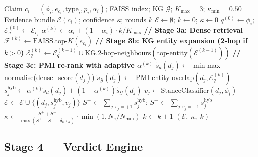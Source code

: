 \documentclass[12pt,a4paper]{article}
\theoremstyle{definition}
\theoremstyle{plain}
\theoremstyle{remark}
\newcommand{\KG}{\mathcal{G}}
\begin{document}
\begin{algorithm}[H]
\caption{ARRS Stage 3 --- Agentic Hybrid Retrieval Loop (Per-Claim)}
\label{alg:arrs_retrieval_loop}
\begin{algorithmic}[1]
\Require Claim $c_i = (\phi_i, e_{c_i}, \text{type}_i, p_i, \alpha_i)$;
         FAISS index; KG $\mathcal{G}$; $K_{\max} = 3$; $\kappa_{\min} = 0.50$
\Ensure Evidence bundle $\mathcal{E}(c_i)$; confidence $\kappa$; rounds $k$
\State $\mathcal{E} \gets \emptyset$; $k \gets 0$; $\kappa \gets 0$
\State $q^{(0)} \gets \phi_i$; 
       $\mathcal{E}_q^{(0)} \gets \mathcal{E}_{c_i}$ 
  \State $\alpha^{(k)} \gets \alpha_i + (1-\alpha_i) \cdot k / K_{\max}$
  \State \textbf{// Stage 3a: Dense retrieval}
  \State $\mathcal{F}^{(k)} \gets \text{FAISS.top-}K(e_{c_i})$ 
  \State \textbf{// Stage 3b: KG entity expansion (2-hop if $k > 0$)}
    \State $\mathcal{E}_q^{(k)} \gets \mathcal{E}_q^{(k-1)} \cup 
           \text{KG.2-hop-neighbours}(\text{top-entity}(\mathcal{E}^{(k-1)}))$
  \EndIf
  \State \textbf{// Stage 3c: PMI re-rank with adaptive $\alpha^{(k)}$}
    \State $\tilde{s}_d(d_j) \gets $ min-max-normalise(dense\_score$(d_j)$)
    \State $\tilde{s}_\KG(d_j) \gets $ PMI-entity-overlap$(d_j, \mathcal{E}_q^{(k)})$
    \State $s_j^{\text{hyb}} \gets \alpha^{(k)} \tilde{s}_d(d_j) 
           + (1-\alpha^{(k)})\tilde{s}_\KG(d_j)$
    \State $v_j \gets \text{StanceClassifier}(d_j, \phi_i)$
    \State $\mathcal{E} \gets \mathcal{E} \cup \{(d_j, s_j^{\text{hyb}}, v_j)\}$
  \EndFor
  \State $S^+ \gets \sum_{j:v_j=+1} s_j^{\text{hyb}}$; 
         $S^- \gets \sum_{j:v_j=-1} s_j^{\text{hyb}}$
  \State $\kappa \gets \frac{S^+ + S^-}{\max(S^+ + S^- + \delta_\nu, \epsilon_\kappa)} 
         \cdot \min(1, N_e / N_{\min})$
  \State $k \gets k + 1$
\EndWhile
\State \Return $(\mathcal{E},\; \kappa,\; k)$
\end{algorithmic}
\end{algorithm}

\subsection{Stage 4 — Verdict Engine}
\label{sec:arrs_stage4}
\end{document}
